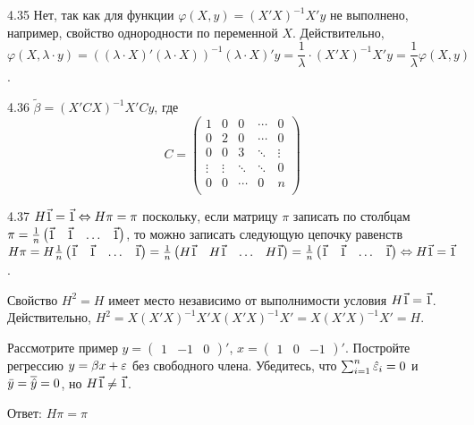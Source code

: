 \protect \hypertarget {soln:4.35}{}
\begin{solution}{{4.35}}
Нет, так как для функции $\varphi(X, y) = (X' X)^{-1} X' y$ не выполнено, например, свойство однородности по переменной $X$. Действительно,
\[\varphi(X, \lambda \cdot y) = ((\lambda \cdot X)' (\lambda \cdot X))^{-1} (\lambda \cdot X)' y = \frac{1}{\lambda} \cdot (X' X)^{-1} X' y = \frac{1}{\lambda} \varphi(X, y)\].
\end{solution}
\protect \hypertarget {soln:4.36}{}
\begin{solution}{{4.36}}
$\tilde{\beta} = (X' CX)^{-1} X' Cy$, где
\[C = \begin{pmatrix}
1 & 0 & 0 & \cdots & 0 \\
0 & 2 & 0 & \cdots & 0 \\
0 & 0 & 3 & \ddots & \vdots \\
\vdots & \vdots & \ddots & \ddots & 0 \\
0 & 0 & \cdots & 0 & n \\
\end{pmatrix} \]
\end{solution}
\protect \hypertarget {soln:4.37}{}
\begin{solution}{{4.37}}
$H\v1 = \v1 \Leftrightarrow H\pi = \pi$ поскольку, если матрицу $\pi$ записать по столбцам $\pi = \frac{1}{n}\begin{pmatrix}
\v1 & \v1 & \ldots & \v1
\end{pmatrix}$, то можно записать следующую цепочку равенств $H\pi = H\frac{1}{n}\begin{pmatrix}
\v1 & \v1 & \ldots & \v1
\end{pmatrix} = \frac{1}{n}\begin{pmatrix}
H\v1 & H\v1 & \ldots & H\v1
\end{pmatrix} = \frac{1}{n}\begin{pmatrix}
\v1 & \v1 & \ldots & \v1
\end{pmatrix} \Leftrightarrow H\v1 = \v1$.

Свойство $H^2 = H$ имеет место независимо от выполнимости условия $H\v1 = \v1$. Действительно, $H^2 = X (X' X)^{-1}X'X(X'X)^{-1}X' = X(X'X)^{-1}X' = H$.

Рассмотрите пример $y = \begin{pmatrix}
1 & -1 & 0
\end{pmatrix}'$, $x = \begin{pmatrix}
1 & 0 & -1
\end{pmatrix}'$. Постройте регрессию $y = \beta x + \varepsilon$ без свободного члена. Убедитесь, что $\sum_{i=1}^n \hat{\varepsilon}_i = 0$ и $\bar{y} = \overline{\hat{y}} = 0$, но $H\v1 \neq \v1$.


Ответ: $H\pi = \pi$
\end{solution}
